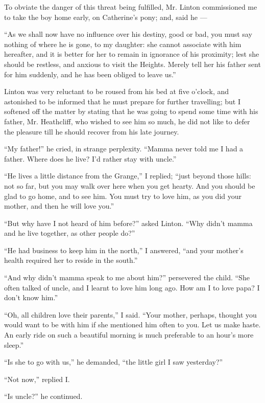 \par To obviate the danger of this threat being fulfilled, Mr. Linton commissioned me to take the boy home early, on Catherine's pony; and, said he —
\par “As we shall now have no influence over his destiny, good or bad, you must say nothing of where he is gone, to my daughter: she cannot associate with him hereafter, and it is better for her to remain in ignorance of his proximity; lest she should be restless, and anxious to visit the Heights. Merely tell her his father sent for him suddenly, and he has been obliged to leave us.”
\par Linton was very reluctant to be roused from his bed at five o'clock, and astonished to be informed that he must prepare for further travelling; but I softened off the matter by stating that he was going to spend some time with his father, Mr. Heathcliff, who wished to see him so much, he did not like to defer the pleasure till he should recover from his late journey.
\par “My father!” he cried, in strange perplexity. “Mamma never told me I had a father. Where does he live? I'd rather stay with uncle.”
\par “He lives a little distance from the Grange,” I replied; “just beyond those hills: not so far, but you may walk over here when you get hearty. And you should be glad to go home, and to see him. You must try to love him, as you did your mother, and then he will love you.”
\par “But why have I not heard of him before?” asked Linton. “Why didn't mamma and he live together, as other people do?”
\par “He had business to keep him in the north,” I answered, “and your mother's health required her to reside in the south.”
\par “And why didn't mamma speak to me about him?” persevered the child. “She often talked of uncle, and I learnt to love him long ago. How am I to love papa? I don't know him.”
\par “Oh, all children love their parents,” I said. “Your mother, perhaps, thought you would want to be with him if she mentioned him often to you. Let us make haste. An early ride on such a beautiful morning is much preferable to an hour's more sleep.”
\par “Is she to go with us,” he demanded, “the little girl I saw yesterday?”
\par “Not now,” replied I.
\par “Is uncle?” he continued.
